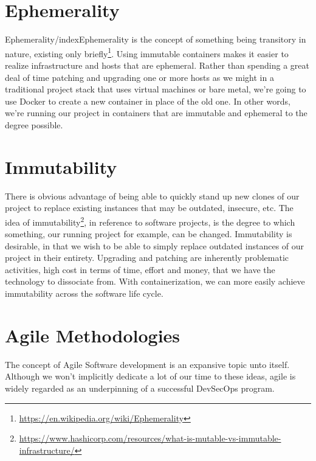 \section{Ephemerality}

\justify
Ephemerality/index{Ephemerality} is the concept of something being transitory in nature,
existing only briefly\footnote{\url{https://en.wikipedia.org/wiki/Ephemerality}}.
Using immutable containers makes it easier to realize infrastructure and
hosts that are ephemeral. Rather than spending a great deal of time
patching and upgrading one or more hosts as we might in a traditional
project stack that uses virtual machines or bare metal, we're going to
use Docker to create a new container in place of the old one. In other
words, we're running our project in containers that are immutable and
ephemeral to the degree possible.

\section{Immutability}

\justify
There is obvious advantage of being able to quickly stand up new clones
of our project to replace existing instances that may be outdated,
insecure, etc. The idea of immutability\footnote{\url{https://www.hashicorp.com/resources/what-is-mutable-vs-immutable-infrastructure/}},
in reference to software projects, is the degree to which something, our
running project for example, can be changed. Immutability is desirable,
in that we wish to be able to simply replace outdated instances of our
project in their entirety. Upgrading and patching are inherently
problematic activities, high cost in terms of time, effort and money,
that we have the technology to dissociate from. With containerization,
we can more easily achieve immutability across the software life cycle.

\section{Agile Methodologies}

\justify
The concept of Agile Software development is an expansive topic unto itself. Although we won't implicitly dedicate a lot of our time to these ideas, agile is widely regarded as an underpinning of a successful
DevSecOps program.